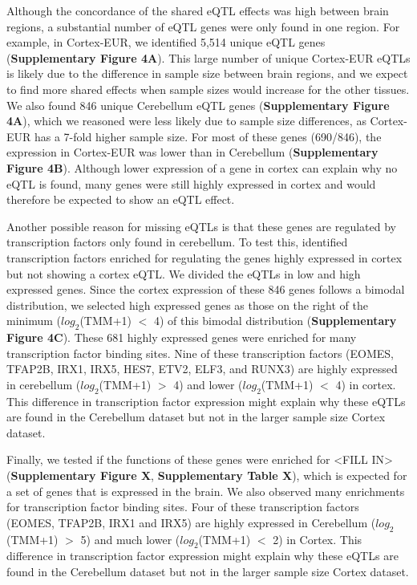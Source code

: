 {{Although the concordance of the shared eQTL effects was high between brain regions, a substantial number of eQTL genes were only found in one region. For example, in Cortex-EUR, we identified 5,514 unique eQTL genes (\textbf{Supplementary Figure 4A}). This large number of unique Cortex-EUR eQTLs is likely due to the difference in sample size between brain regions, and we expect to find more shared effects when sample sizes would increase for the other tissues. We also found 846 unique Cerebellum eQTL genes (\textbf{Supplementary Figure 4A}), which we reasoned were less likely due to sample size differences, as Cortex-EUR has a 7-fold higher sample size. For most of these genes (690/846), the expression in Cortex-EUR was lower than in Cerebellum (\textbf{Supplementary Figure 4B}). Although lower expression of a gene in cortex can explain why no eQTL is found, many genes were still highly expressed in cortex and would therefore be expected to show an eQTL effect.  

Another possible reason for missing eQTLs is that these genes are regulated by transcription factors only found in cerebellum. To test this, identified transcription factors enriched for regulating the genes highly expressed in cortex but not showing a cortex eQTL. We divided the eQTLs in low and high expressed genes. Since the cortex expression of these 846 genes follows a bimodal distribution, we selected high expressed genes as those on the right of the minimum ($log_2$(TMM+1) $<$ 4) of this bimodal distribution (\textbf{Supplementary Figure 4C}). These 681 highly expressed genes were enriched for many transcription factor binding sites. Nine of these transcription factors (EOMES, TFAP2B, IRX1, IRX5, HES7, ETV2, ELF3, and RUNX3) are highly expressed in cerebellum ($log_2$(TMM+1) $>$ 4) and lower ($log_2$(TMM+1) $<$ 4) in cortex. This difference in transcription factor expression might explain why these eQTLs are found in the Cerebellum dataset but not in the larger sample size Cortex dataset. 

Finally, we tested if the functions of these genes were enriched for <FILL IN> (\textbf{Supplementary Figure X}, \textbf{Supplementary Table X}), which is expected for a set of genes that is expressed in the brain. We also observed many enrichments for transcription factor binding sites. Four of these transcription factors (EOMES, TFAP2B, IRX1 and IRX5) are highly expressed in Cerebellum ($log_2$(TMM+1) $>$ 5) and much lower ($log_2$(TMM+1) $<$ 2) in Cortex. This difference in transcription factor expression might explain why these eQTLs are found in the Cerebellum dataset but not in the larger sample size Cortex dataset. 

}}
